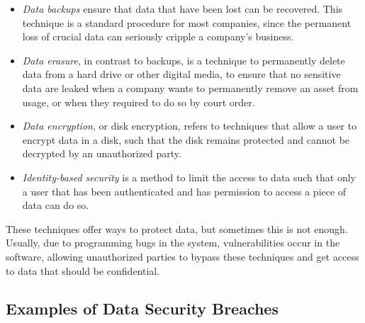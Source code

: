 \begin{itemize}

    \item \textit{Data backups} ensure that data that have been lost can be recovered. This technique is a standard procedure for most companies, since the permanent loss of crucial data can seriously cripple a company's business.

    \item \textit{Data erasure}, in contrast to backups, is a technique to permanently delete data from a hard drive or other digital media, to ensure that no sensitive data are leaked when a company wants to permanently remove an asset from usage, or when they required to do so by court order.

    \item \textit{Data encryption}, or disk encryption, refers to techniques that allow a user to encrypt data in a disk, such that the disk remains protected and cannot be decrypted by an unauthorized party.

    \item \textit{Identity-based security} is a method to limit the access to data such that only a user that has been authenticated and has permission to access a piece of data can do so.


\end{itemize}


These techniques offer ways to protect data, but sometimes this is not enough. Usually, due to programming bugs in the system, vulnerabilities occur in the software, allowing unauthorized parties to bypass these techniques and get access to data that should be confidential.



\subsection{Examples of Data Security Breaches} 
\label{ssec:ExamplesDataSecurityBreaches}


